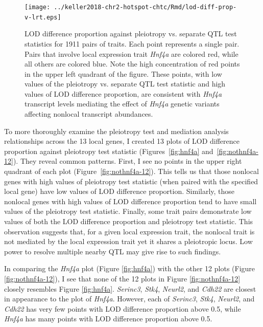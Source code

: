 \documentclass[oneside]{book}\usepackage[]{graphicx}\usepackage[]{color}
\begin{document}
\begin{figure}
    \centering
    \texttt{[image: ../keller2018-chr2-hotspot-chtc/Rmd/lod-diff-prop-v-lrt.eps]}
    \caption[LOD difference proportion vs. pleiotropy test statistic]{LOD difference proportion against pleiotropy vs. separate QTL test statistics for 1911 pairs of traits. 
    Each point represents a single pair. Pairs that involve local expression trait \emph{Hnf4a} are colored red, while all others are colored blue. 
    Note the high concentration of red points in the upper left quadrant of the figure. 
    These points, with low values of the pleiotropy vs. separate QTL test statistic and 
    high values of LOD difference proportion, are consistent with \emph{Hnf4a} transcript 
    levels mediating the effect of \emph{Hnf4a} genetic variants affecting nonlocal 
    transcript abundances.}
    \label{fig:lod-diff-prop-v-lrt-all}
\end{figure}


To more thoroughly examine the pleiotropy test and mediation analysis 
relationships across the 13 local genes, 
I created 13 plots of LOD difference proportion against pleiotropy test 
statistic (Figures~\ref{fig:hnf4a} and~\ref{fig:nothnf4a-12}). 
They reveal common patterns. 
First, I see no points in the upper right quadrant of each plot (Figure~\ref{fig:nothnf4a-12}). 
This tells us that those nonlocal genes with high values of pleiotropy test statistic 
(when paired with the specified local gene) have low values of LOD difference proportion. 
Similarly, those nonlocal genes with high values of LOD difference proportion tend 
to have small values of the pleiotropy test statistic. 
Finally, some trait pairs demonstrate low values of both 
the LOD difference proportion and pleiotropy test statistic. 
This observation suggests that, for a given local expression trait, the nonlocal trait 
is not mediated by the local expression trait yet it shares a pleiotropic locus. 
Low power to resolve multiple nearby QTL may give rise to such findings.

In comparing the \emph{Hnf4a} plot (Figure \ref{fig:hnf4a}) with the other 
12 plots (Figure \ref{fig:nothnf4a-12}), 
I see that none of the 12 plots in Figure \ref{fig:nothnf4a-12} closely resembles Figure \ref{fig:hnf4a}. 
\emph{Serinc3}, \emph{Stk4}, \emph{Neurl2}, and \emph{Cdh22} are closest in appearance to the plot of \emph{Hnf4a}. 
However, each of \emph{Serinc3}, \emph{Stk4}, \emph{Neurl2}, and \emph{Cdh22} 
has very few points with LOD difference proportion above 0.5, 
while \emph{Hnf4a} has many points with LOD difference proportion above 0.5.
\end{document}
